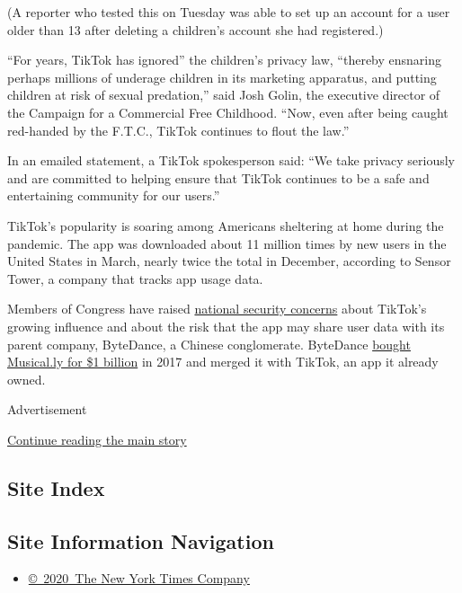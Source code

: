 (A reporter who tested this on Tuesday was able to set up an account for
a user older than 13 after deleting a children's account she had
registered.)

``For years, TikTok has ignored'' the children's privacy law, ``thereby
ensnaring perhaps millions of underage children in its marketing
apparatus, and putting children at risk of sexual predation,'' said Josh
Golin, the executive director of the Campaign for a Commercial Free
Childhood. ``Now, even after being caught red-handed by the F.T.C.,
TikTok continues to flout the law.''

In an emailed statement, a TikTok spokesperson said: ``We take privacy
seriously and are committed to helping ensure that TikTok continues to
be a safe and entertaining community for our users.''

TikTok's popularity is soaring among Americans sheltering at home during
the pandemic. The app was downloaded about 11 million times by new users
in the United States in March, nearly twice the total in December,
according to Sensor Tower, a company that tracks app usage data.

Members of Congress have raised
\href{https://www.nytimes.com/2019/11/01/technology/tiktok-national-security-review.html}{national
security concerns} about TikTok's growing influence and about the risk
that the app may share user data with its parent company, ByteDance, a
Chinese conglomerate. ByteDance
\href{https://www.nytimes.com/2017/11/10/business/dealbook/musically-sold-app-video.html}{bought
Musical.ly for \$1 billion} in 2017 and merged it with TikTok, an app it
already owned.

Advertisement

\protect\hyperlink{after-bottom}{Continue reading the main story}

\hypertarget{site-index}{%
\subsection{Site Index}\label{site-index}}

\hypertarget{site-information-navigation}{%
\subsection{Site Information
Navigation}\label{site-information-navigation}}

\begin{itemize}
\tightlist
\item
  \href{https://help.nytimes.com/hc/en-us/articles/115014792127-Copyright-notice}{©~2020~The
  New York Times Company}
\end{itemize}

